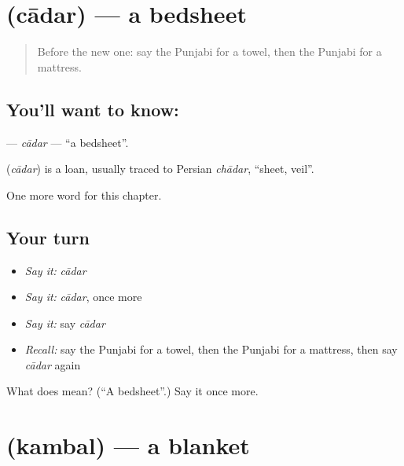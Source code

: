 \section[\texorpdfstring{\pa{ਚਾਦਰ} (cādar)}{ਚਾਦਰ (cādar)}]{ (cādar) — a bedsheet}

\label{lesson:PA-C114-cadar}



\begin{quote}
Before the new one: say the Punjabi for a towel, then the Punjabi for a mattress.
\end{quote}

\subsection*{You'll want to know: }
\textbf{} — \emph{cādar} — \textquotedblleft{}a bedsheet\textquotedblright{}.

\begin{cousinweb}
\textbf{} (\emph{cādar}) is a loan, usually traced to Persian \emph{chādar}, \textquotedblleft{}sheet, veil\textquotedblright{}.
\end{cousinweb}

\begin{grammarlens}[title={What you've built}]
One more word for this chapter.
\end{grammarlens}

\subsection*{Your turn}
\begin{itemize}
\raggedright
  \item \emph{Say it:} \emph{cādar}
  \item \emph{Say it:} \emph{cādar}, once more
  \item \emph{Say it:} say \emph{cādar}
  \item \emph{Recall:} say the Punjabi for a towel, then the Punjabi for a mattress, then say \emph{cādar} again
\end{itemize}

\begin{tcolorbox}[breakable,colback=teal!4,colframe=teal!35!black,title={Before you move on}]
What does  mean? (\textquotedblleft{}A bedsheet\textquotedblright{}.) Say it once more.
\end{tcolorbox}
\section[\texorpdfstring{\pa{ਕੰਬਲ} (kambal)}{ਕੰਬਲ (kambal)}]{ (kambal) — a blanket}

